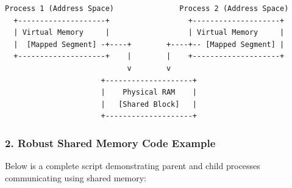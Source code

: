 \begin{lstlisting}
Process 1 (Address Space)               Process 2 (Address Space)
  +--------------------+                  +--------------------+
  | Virtual Memory     |                  | Virtual Memory     |
  |  [Mapped Segment] -+----+        +----+-- [Mapped Segment] |
  +--------------------+    |        |    +--------------------+
                            v        v
                      +--------------------+
                      |    Physical RAM    |
                      |   [Shared Block]   |
                      +--------------------+
\end{lstlisting}

\hypertarget{robust-shared-memory-code-example}{%
\subsubsection{2. Robust Shared Memory Code
Example}\label{robust-shared-memory-code-example}}

Below is a complete script demonstrating parent and child processes
communicating using shared memory:

